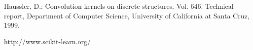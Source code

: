\documentclass[runningheads,a4paper]{llncs}
\begin{document}
\begin{thebibliography}{4}
 Haussler, D.: Convolution kernels on discrete structures. Vol. 646. Technical report, Department of Computer Science, University of California at Santa Cruz, 1999.

 http://www.scikit-learn.org/

%
%
%
%
%

\end{thebibliography}
\end{document}
